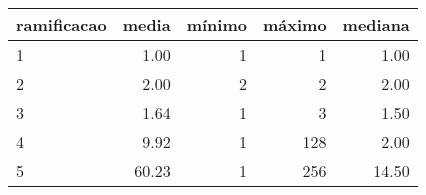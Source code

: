 \begin{table}[ht]
\centering
\begin{tabular}{lrrrr}
  \hline
ramificacao & media & mínimo & máximo & mediana \\ 
  \hline
1 & 1.00 &   1 &   1 & 1.00 \\ 
  2 & 2.00 &   2 &   2 & 2.00 \\ 
  3 & 1.64 &   1 &   3 & 1.50 \\ 
  4 & 9.92 &   1 & 128 & 2.00 \\ 
  5 & 60.23 &   1 & 256 & 14.50 \\ 
   \hline
\end{tabular}
\end{table}

